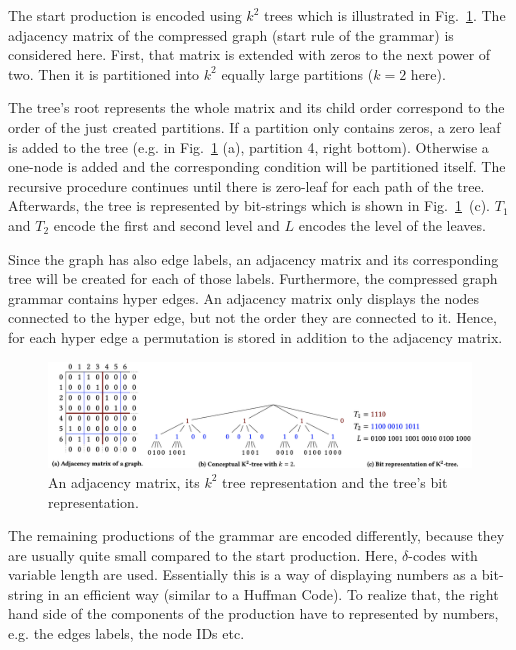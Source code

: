 The start production is encoded using $k^2$ trees which is illustrated in Fig.~\ref{fig:encoding}. The adjacency matrix of the compressed graph (start rule of the grammar) is considered here. First, that matrix is extended with zeros to the next power of two. Then it is partitioned into $k^2$ equally large partitions ($k=2$ here).

The tree's root represents the whole matrix and its child order correspond to the order of the just created partitions. If a partition only contains zeros, a zero leaf is added to the tree (e.g. in Fig.~\ref{fig:encoding} (a), partition 4, right bottom). Otherwise a one-node is added and the corresponding condition will be partitioned itself. The recursive procedure continues until there is zero-leaf for each path of the tree. Afterwards, the tree is represented by bit-strings which is shown in Fig.~\ref{fig:encoding}~(c). $T_1$ and $T_2$ encode the first and second level and $L$ encodes the level of the leaves. 

Since the graph has also edge labels, an adjacency matrix and its corresponding tree will be created for each of those labels. Furthermore, the compressed graph grammar contains hyper edges. An adjacency matrix only displays the nodes connected to the hyper edge, but not the order they are connected to it. Hence, for each hyper edge a permutation is stored in addition to the adjacency matrix.

\begin{figure}
	\centering
	\includegraphics[width=1\linewidth]{figures/relatedwork/encoding}
	\caption{An adjacency matrix, its $k^2$ tree representation and the tree's bit representation.}
	\label{fig:encoding}
\end{figure}

The remaining productions of the grammar are encoded differently, because they are usually quite small compared to the start production. Here, $\delta $-codes with variable length are used. Essentially this is a way of displaying numbers as a bit-string in an efficient way (similar to a Huffman Code). To realize that, the right hand side of the components of the production have to represented by numbers, e.g. the edges labels, the node IDs etc.~\cite{maneth}


